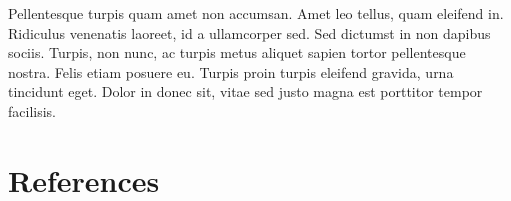 \documentclass[
  12,
]{article}
\begin{document}
Pellentesque turpis quam amet non accumsan. Amet leo tellus, quam
eleifend in. Ridiculus venenatis laoreet, id a ullamcorper sed. Sed
dictumst in non dapibus sociis. Turpis, non nunc, ac turpis metus
aliquet sapien tortor pellentesque nostra. Felis etiam posuere eu.
Turpis proin turpis eleifend gravida, urna tincidunt eget. Dolor in
donec sit, vitae sed justo magna est porttitor tempor facilisis.

\hypertarget{references}{%
\section{References}\label{references}}
\end{document}

